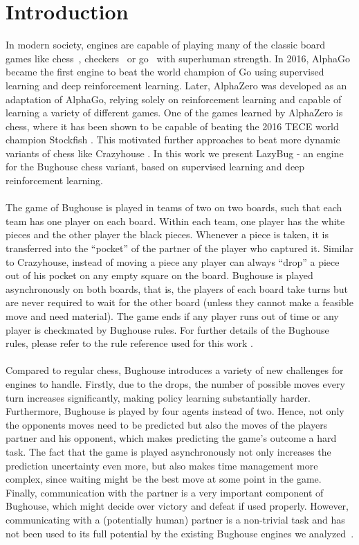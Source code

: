 \section{Introduction}
In modern society, engines are capable of playing many of the classic board games like chess~\cite{deepblue}, checkers~\cite{checkers} or go~\cite{alphago} with superhuman strength.
In 2016, AlphaGo became the first engine to beat the world champion of Go using supervised learning and deep reinforcement learning\cite{silver2016mastering}.
Later, AlphaZero\cite{alphazero} was developed as an adaptation of AlphaGo, relying solely on reinforcement learning and capable of learning a variety of different games.
One of the games learned by AlphaZero is chess, where it has been shown to be capable of beating the 2016 TECE world champion Stockfish \cite{alphazero}.
This motivated further approaches to beat more dynamic variants of chess like Crazyhouse \cite{Crazyara}.
In this work we present LazyBug - an engine for the Bughouse chess variant, based on supervised learning and deep reinforcement learning.
\\\\
The game of Bughouse is played in teams of two on two boards, such that each team has one player on each board.
Within each team, one player has the white pieces and the other player the black pieces.
Whenever a piece is taken, it is transferred into the ``pocket'' of the partner of the player who captured it.
Similar to Crazyhouse, instead of moving a piece any player can always ``drop'' a piece out of his pocket on any empty square on the board.
Bughouse is played asynchronously on both boards, that is, the players of each board take turns but are never required to wait for the other board (unless they cannot make a feasible move and need material).
The game ends if any player runs out of time or any player is checkmated by Bughouse rules.
For further details of the Bughouse rules, please refer to the rule reference used for this work \cite{bughouse_rules}.
\\\\
Compared to regular chess, Bughouse introduces a variety of new challenges for engines to handle.
Firstly, due to the drops, the number of possible moves every turn increases significantly, making policy learning substantially harder.
Furthermore, Bughouse is played by four agents instead of two.
Hence, not only the opponents moves need to be predicted but also the moves of the players partner and his opponent, which makes predicting the game's outcome a hard task.
The fact that the game is played asynchronously not only increases the prediction uncertainty even more, but also makes time management more complex, since waiting might be the best move at some point in the game.
Finally, communication with the partner is a very important component of Bughouse, which might decide over victory and defeat if used properly.
However, communicating with a (potentially human) partner is a non-trivial task and has not been used to its full potential by the existing Bughouse engines we analyzed~\cite{sjeng, sunsetter}.

